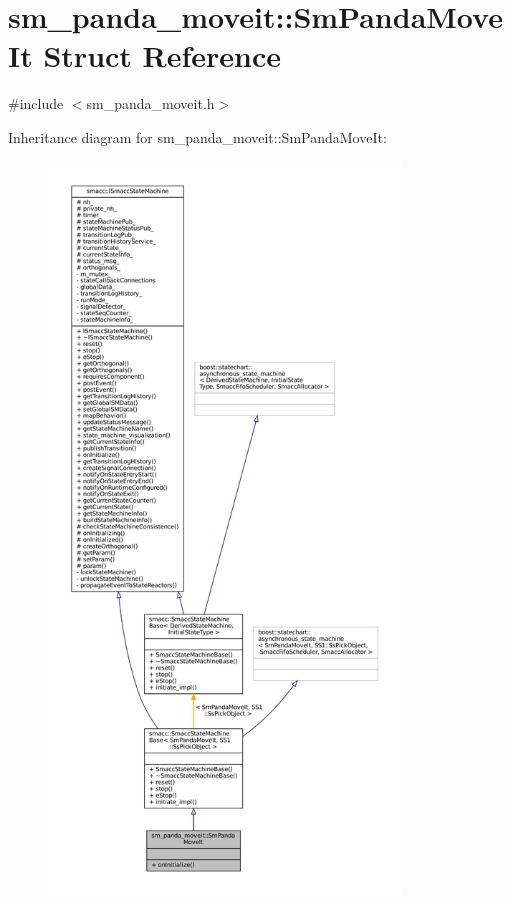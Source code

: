 \hypertarget{structsm__panda__moveit_1_1SmPandaMoveIt}{}\section{sm\+\_\+panda\+\_\+moveit\+:\+:Sm\+Panda\+Move\+It Struct Reference}
\label{structsm__panda__moveit_1_1SmPandaMoveIt}


{\ttfamily \#include $<$sm\+\_\+panda\+\_\+moveit.\+h$>$}



Inheritance diagram for sm\+\_\+panda\+\_\+moveit\+:\+:Sm\+Panda\+Move\+It\+:
\nopagebreak
\begin{figure}[H]
\begin{center}
\leavevmode
\includegraphics[height=550pt]{structsm__panda__moveit_1_1SmPandaMoveIt__inherit__graph}
\end{center}
\end{figure}


